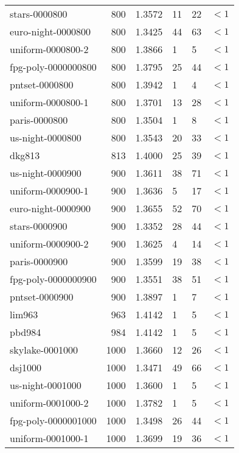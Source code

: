 \begin{longtable}{|lrrlll|}
stars-0000800 & 800 & \num{1.3572} & \num{11} & \num{22} & $<1$ \\
euro-night-0000800 & 800 & \num{1.3425} & \num{44} & \num{63} & $<1$ \\
uniform-0000800-2 & 800 & \num{1.3866} & \num{1} & \num{5} & $<1$ \\
fpg-poly-0000000800 & 800 & \num{1.3795} & \num{25} & \num{44} & $<1$ \\
pntset-0000800 & 800 & \num{1.3942} & \num{1} & \num{4} & $<1$ \\
uniform-0000800-1 & 800 & \num{1.3701} & \num{13} & \num{28} & $<1$ \\
paris-0000800 & 800 & \num{1.3504} & \num{1} & \num{8} & $<1$ \\
us-night-0000800 & 800 & \num{1.3543} & \num{20} & \num{33} & $<1$ \\
dkg813 & 813 & \num{1.4000} & \num{25} & \num{39} & $<1$ \\
us-night-0000900 & 900 & \num{1.3611} & \num{38} & \num{71} & $<1$ \\
uniform-0000900-1 & 900 & \num{1.3636} & \num{5} & \num{17} & $<1$ \\
euro-night-0000900 & 900 & \num{1.3655} & \num{52} & \num{70} & $<1$ \\
stars-0000900 & 900 & \num{1.3352} & \num{28} & \num{44} & $<1$ \\
uniform-0000900-2 & 900 & \num{1.3625} & \num{4} & \num{14} & $<1$ \\
paris-0000900 & 900 & \num{1.3599} & \num{19} & \num{38} & $<1$ \\
fpg-poly-0000000900 & 900 & \num{1.3551} & \num{38} & \num{51} & $<1$ \\
pntset-0000900 & 900 & \num{1.3897} & \num{1} & \num{7} & $<1$ \\
lim963 & 963 & \num{1.4142} & \num{1} & \num{5} & $<1$ \\
pbd984 & 984 & \num{1.4142} & \num{1} & \num{5} & $<1$ \\
skylake-0001000 & 1000 & \num{1.3660} & \num{12} & \num{26} & $<1$ \\
dsj1000 & 1000 & \num{1.3471} & \num{49} & \num{66} & $<1$ \\
us-night-0001000 & 1000 & \num{1.3600} & \num{1} & \num{5} & $<1$ \\
uniform-0001000-2 & 1000 & \num{1.3782} & \num{1} & \num{5} & $<1$ \\
fpg-poly-0000001000 & 1000 & \num{1.3498} & \num{26} & \num{44} & $<1$ \\
uniform-0001000-1 & 1000 & \num{1.3699} & \num{19} & \num{36} & $<1$ \\

\end{longtable}
